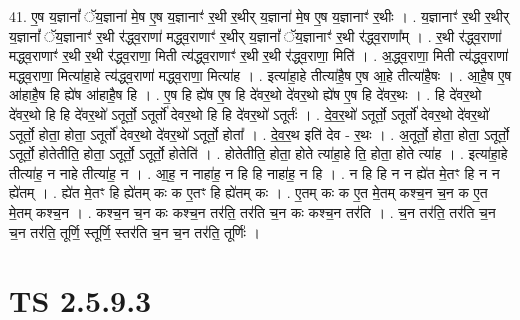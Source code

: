 \documentclass[17pt]{extarticle}
\begin{document}
41. ए॒ष य॒ज्ञानां᳚ ॅय॒ज्ञाना॑ मे॒ष ए॒ष य॒ज्ञानाꣳ॑ र॒थी र॒थीर् य॒ज्ञाना॑ मे॒ष ए॒ष य॒ज्ञानाꣳ॑ र॒थीः । . य॒ज्ञानाꣳ॑ र॒थी र॒थीर् य॒ज्ञानां᳚ ॅय॒ज्ञानाꣳ॑ र॒थी र॑द्ध्व॒राणा॑ मद्ध्व॒राणाꣳ॑ र॒थीर् य॒ज्ञानां᳚ ॅय॒ज्ञानाꣳ॑ र॒थी र॑द्ध्व॒राणा᳚म् । . र॒थी र॑द्ध्व॒राणा॑ मद्ध्व॒राणाꣳ॑ र॒थी र॒थी र॑द्ध्व॒राणा॒ मिती त्य॑द्ध्व॒राणाꣳ॑ र॒थी र॒थी र॑द्ध्व॒राणा॒ मिति॑ । . अ॒द्ध्व॒राणा॒ मिती त्य॑द्ध्व॒राणा॑ मद्ध्व॒राणा॒ मित्या॑हा॒हे त्य॑द्ध्व॒राणा॑ मद्ध्व॒राणा॒ मित्या॑ह । . इत्या॑हा॒हे तीत्या॑है॒ष ए॒ष आ॒हे तीत्या॑है॒षः । . आ॒है॒ष ए॒ष आ॑हाहै॒ष हि ह्ये॑ष आ॑हाहै॒ष हि । . ए॒ष हि ह्ये॑ष ए॒ष हि दे॑वर॒थो दे॑वर॒थो ह्ये॑ष ए॒ष हि दे॑वर॒थः । . हि दे॑वर॒थो दे॑वर॒थो हि हि दे॑वर॒थो॑ ऽतूर्तो॒ ऽतूर्तो॑ देवर॒थो हि हि दे॑वर॒थो॑ ऽतूर्तः॑ । . दे॒व॒र॒थो॑ ऽतूर्तो॒ ऽतूर्तो॑ देवर॒थो दे॑वर॒थो॑ ऽतूर्तो॒ होता॒ होता॒ ऽतूर्तो॑ देवर॒थो दे॑वर॒थो॑ ऽतूर्तो॒ होता᳚ । . दे॒व॒र॒थ इति॑ देव - र॒थः । . अ॒तूर्तो॒ होता॒ होता॒ ऽतूर्तो॒ ऽतूर्तो॒ होतेतीति॒ होता॒ ऽतूर्तो॒ ऽतूर्तो॒ होतेति॑ । . होतेतीति॒ होता॒ होते त्या॑हा॒हे ति॒ होता॒ होते त्या॑ह । . इत्या॑हा॒हे तीत्या॑ह॒ न नाहे तीत्या॑ह॒ न । . आ॒ह॒ न नाहा॑ह॒ न हि हि नाहा॑ह॒ न हि । . न हि हि न न ह्ये॑त मे॒तꣳ हि न न ह्ये॑तम् । . ह्ये॑त मे॒तꣳ हि ह्ये॑तम् कः क ए॒तꣳ हि ह्ये॑तम् कः । . ए॒तम् कः क ए॒त मे॒तम् कश्च॒न च॒न क ए॒त मे॒तम् कश्च॒न । . कश्च॒न च॒न कः कश्च॒न तर॑ति॒ तर॑ति च॒न कः कश्च॒न तर॑ति । . च॒न तर॑ति॒ तर॑ति च॒न च॒न तर॑ति॒ तूर्णि॒ स्तूर्णि॒ स्तर॑ति च॒न च॒न तर॑ति॒ तूर्णिः॑ । \newline
\pagebreak
{}

\section{ TS 2.5.9.3 }
\end{document}
